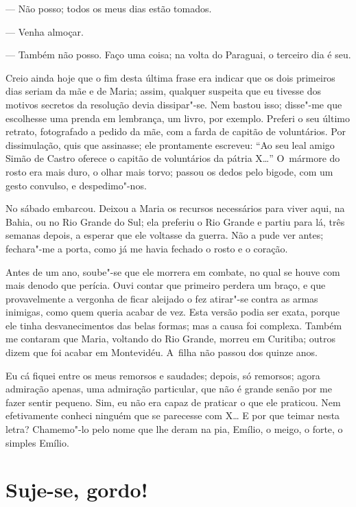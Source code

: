 \begin{linenumbers}
--- Não posso; todos os meus dias estão tomados.

--- Venha almoçar.

--- Também não posso. Faço uma coisa; na volta do Paraguai, o terceiro
dia é seu.

Creio ainda hoje que o fim desta última frase era indicar que os dois
primeiros dias seriam da mãe e de Maria; assim, qualquer suspeita que eu
tivesse dos motivos secretos da resolução devia dissipar"-se. Nem bastou
isso; disse"-me que escolhesse uma prenda em lembrança, um livro, por
exemplo. Preferi o seu último retrato, fotografado a pedido da mãe, com
a farda de capitão de voluntários. Por dissimulação, quis que assinasse;
ele prontamente escreveu: ``Ao seu leal amigo Simão de Castro oferece o
capitão de voluntários da pátria X\ldots{}'' O~mármore do rosto era mais
duro, o olhar mais torvo; passou os dedos pelo bigode, com um gesto
convulso, e despedimo"-nos.

No sábado embarcou. Deixou a Maria os recursos necessários para viver
aqui, na Bahia, ou no Rio Grande do Sul; ela preferiu o Rio Grande e
partiu para lá, três semanas depois, a esperar que ele voltasse da
guerra. Não a pude ver antes; fechara"-me a porta, como já me havia
fechado o rosto e o coração.

Antes de um ano, soube"-se que ele morrera em combate, no qual se houve
com mais denodo que perícia. Ouvi contar que primeiro perdera um braço,
e que provavelmente a vergonha de ficar aleijado o fez atirar"-se contra
as armas inimigas, como quem queria acabar de vez. Esta versão podia ser
exata, porque ele tinha desvanecimentos das belas formas; mas a causa
foi complexa. Também me contaram que Maria, voltando do Rio Grande,
morreu em Curitiba; outros dizem que foi acabar em Montevidéu. A~filha
não passou dos quinze anos.

Eu cá fiquei entre os meus remorsos e saudades; depois, só remorsos;
agora admiração apenas, uma admiração particular, que não é grande senão
por me fazer sentir pequeno. Sim, eu não era capaz de praticar o que ele
praticou. Nem efetivamente conheci ninguém que se parecesse com X\ldots{} E
por que teimar nesta letra? Chamemo"-lo pelo nome que lhe deram na pia,
Emílio, o meigo, o forte, o simples Emílio.

\end{linenumbers}

\chapter{Suje-se, gordo!}

